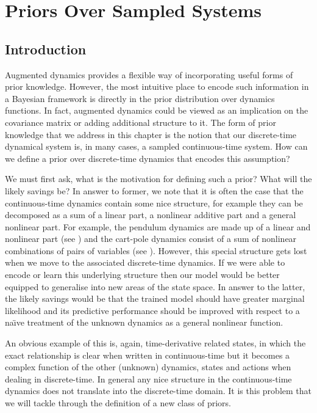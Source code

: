 \chapter{P\lowercase{riors} O\lowercase{ver} S\lowercase{ampled} S\lowercase{ystems}}

\section{Introduction}
Augmented dynamics provides a flexible way of incorporating useful forms of prior knowledge. However, the most intuitive place to encode such information in a Bayesian framework is directly in the prior distribution over dynamics functions. In fact, augmented dynamics could be viewed as an implication on the covariance matrix or adding additional structure to it. The form of prior knowledge that we address in this chapter is the notion that our discrete-time dynamical system is, in many cases, a sampled continuous-time system. How can we define a prior over discrete-time dynamics that encodes this assumption?

We must first ask, what is the motivation for defining such a prior? What will the likely savings be? In answer to former, we note that it is often the case that the continuous-time dynamics contain some nice structure, for example they can be decomposed as a sum of a linear part, a nonlinear additive part and a general nonlinear part. For example, the pendulum dynamics are made up of a linear and nonlinear part (see ) and the cart-pole dynamics consist of a sum of nonlinear combinations of pairs of variables (see ). However, this special structure gets lost when we move to the associated discrete-time dynamics. If we were able to encode or learn this underlying structure then our model would be better equipped to generalise into new areas of the state space. In answer to the latter, the likely savings would be that the trained model should have greater marginal likelihood and its predictive performance should be improved with respect to a na\"{\i}ve treatment of the unknown dynamics as a general nonlinear function.

An obvious example of this is, again, time-derivative related states, in which the exact relationship is clear when written in continuous-time but it becomes a complex function of the other (unknown) dynamics, states and actions when dealing in discrete-time. In general any nice structure in the continuous-time dynamics does not translate into the discrete-time domain. It is this problem that we will tackle through the definition of a new class of priors.


